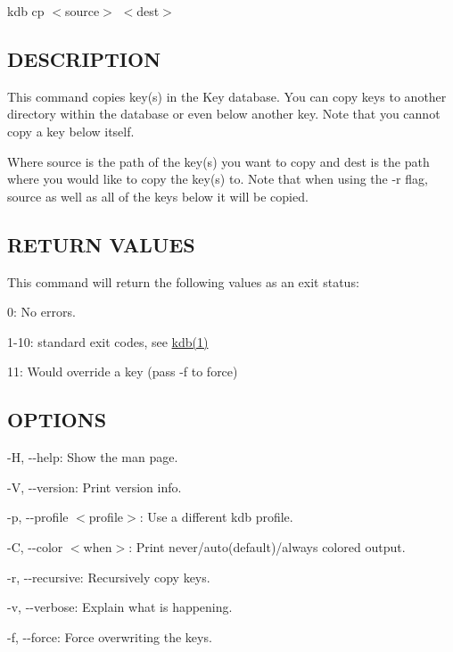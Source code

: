 {\ttfamily kdb cp $<$source$>$ $<$dest$>$}

\subsection*{D\+E\+S\+C\+R\+I\+P\+T\+I\+ON}

This command copies key(s) in the Key database. You can copy keys to another directory within the database or even below another key. Note that you cannot copy a key below itself.

Where {\ttfamily source} is the path of the key(s) you want to copy and {\ttfamily dest} is the path where you would like to copy the key(s) to. Note that when using the {\ttfamily -\/r} flag, {\ttfamily source} as well as all of the keys below it will be copied.

\subsection*{R\+E\+T\+U\+RN V\+A\+L\+U\+ES}

This command will return the following values as an exit status\+:~\newline

\begin{DoxyItemize}
\item 0\+: No errors.
\item 1-\/10\+: standard exit codes, see \hyperlink{md_doc_help_kdb_doc_help_kdb_md}{kdb(1)}
\item 11\+: Would override a key (pass {\ttfamily -\/f} to force)
\end{DoxyItemize}

\subsection*{O\+P\+T\+I\+O\+NS}


\begin{DoxyItemize}
\item {\ttfamily -\/H}, {\ttfamily -\/-\/help}\+: Show the man page.
\item {\ttfamily -\/V}, {\ttfamily -\/-\/version}\+: Print version info.
\item {\ttfamily -\/p}, {\ttfamily -\/-\/profile $<$profile$>$}\+: Use a different kdb profile.
\item {\ttfamily -\/C}, {\ttfamily -\/-\/color $<$when$>$}\+: Print never/auto(default)/always colored output.
\item {\ttfamily -\/r}, {\ttfamily -\/-\/recursive}\+: Recursively copy keys.
\item {\ttfamily -\/v}, {\ttfamily -\/-\/verbose}\+: Explain what is happening.
\item {\ttfamily -\/f}, {\ttfamily -\/-\/force}\+: Force overwriting the keys.
\end{DoxyItemize}

